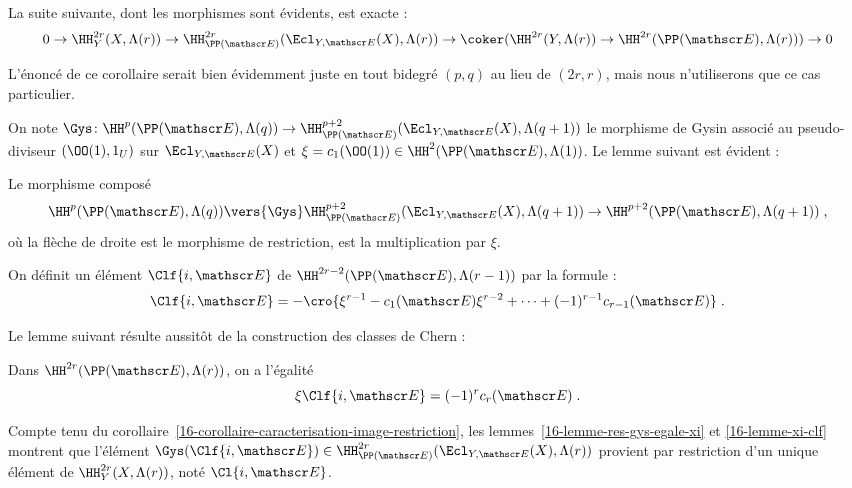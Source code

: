 \documentclass[10pt]{../fichiers-configuration-latex/smfart}
\begin{document}
\begin{corollaire3}\label{16-corollaire-caracterisation-image-restriction}
La suite suivante, dont les morphismes sont évidents, est exacte :
\[0\to \HH^{2r}_Y(X,\Lambda(r)) \to 
\HH^{2r}_{\PP(\mathscr E)}(\Ecl_{Y,\mathscr E}(X),\Lambda(r))\to
\coker(\HH^{2r}(Y,\Lambda(r))\to \HH^{2r}(\PP(\mathscr E),\Lambda(r)))\to 0\]
\end{corollaire3}

L'énoncé de ce corollaire serait bien évidemment juste en tout bidegré
$(p,q)$ au lieu de $(2r,r)$, mais nous n'utiliserons que ce cas
particulier.

\bigskip

On note $\Gys\colon \HH^p(\PP(\mathscr E),\Lambda(q))\to
\HH^{p+2}_{\PP(\mathscr E)}(\Ecl_{Y,\mathscr E}(X),\Lambda(q+1))$ le
morphisme de Gysin associé au pseudo-diviseur $(\OO(1),1_U)$ sur 
$\Ecl_{Y,\mathscr E}(X)$ et $\xi=c_1(\OO(1))\in \HH^2(\PP(\mathscr
E),\Lambda(1))$. Le lemme suivant est évident :

\begin{lemme3}\label{16-lemme-res-gys-egale-xi}
Le morphisme composé
\[\HH^p(\PP(\mathscr E),\Lambda(q))\vers {\Gys} \HH^{p+2}_{\PP(\mathscr
E)}(\Ecl_{Y,\mathscr E}(X),\Lambda(q+1))\to  \HH^{p+2}(\PP(\mathscr
E),\Lambda(q+1))\;\text{,}\]
où la flèche de droite est le morphisme de restriction, est la
multiplication par $\xi$.
\end{lemme3}

\begin{definition3}
On définit un élément $\Clf {i,\mathscr E}$ de $\HH^{2r-2}(\PP(\mathscr
E),\Lambda(r-1))$ par la formule :
\[\Clf {i,\mathscr E}=-\cro{\xi^{r-1}-c_1(\mathscr
E)\xi^{r-2}+\dots+ (-1)^{r-1}c_{r-1}(\mathscr E)}\;\text{.}\]
\end{definition3}

Le lemme suivant résulte aussitôt de la construction des classes de Chern :

\begin{lemme3}\label{16-lemme-xi-clf}
Dans $\HH^{2r}(\PP(\mathscr E),\Lambda(r))$, on a l'égalité
\[\xi\Clf{i,\mathscr E}=(-1)^rc_r({\mathscr E})\;\text{.}\]
\end{lemme3}

\begin{definition3}
Compte tenu du corollaire~\ref{16-corollaire-caracterisation-image-restriction}, 
les lemmes~\ref{16-lemme-res-gys-egale-xi}
et \ref{16-lemme-xi-clf} 
montrent que l'élément
$\Gys(\Clf{i,\mathscr E})\in \HH^{2r}_{\PP(\mathscr E)}(\Ecl_{Y,\mathscr
E}(X),\Lambda(r))$ provient par restriction d'un unique élément de
$\HH^{2r}_Y(X,\Lambda(r))$, noté $\Cl{i,\mathscr E}$.
\end{definition3}
\end{document}
